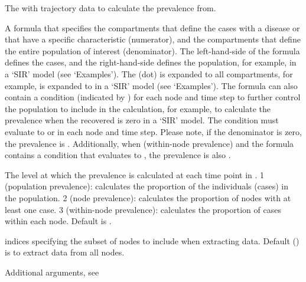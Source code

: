 \documentclass[letterpaper]{book}
\begin{document}
\begin{Arguments}
\begin{ldescription}
\item[\code{model}] The  with trajectory data to calculate
the prevalence from.

\item[\code{formula}] A formula that specifies the compartments that
define the cases with a disease or that have a specific
characteristic (numerator), and the compartments that define
the entire population of interest (denominator). The
left-hand-side of the formula defines the cases, and the
right-hand-side defines the population, for example,
 in a `SIR' model (see
`Examples'). The   (dot) is expanded to all
compartments, for example,   is expanded to
 in a `SIR' model (see
`Examples'). The formula can also contain a condition
(indicated by \code{|}) for each node and time step to further
control the population to include in the calculation, for
example,  to calculate the prevalence
when the recovered is zero in a `SIR' model. The
condition must evaluate to  or  in each
node and time step. Please note, if the denominator is zero,
the prevalence is . Additionally, when
 (within-node prevalence) and the formula
contains a condition that evaluates to , the
prevalence is also .

\item[\code{level}] The level at which the prevalence is calculated at
each time point in . 1 (population prevalence):
calculates the proportion of the individuals (cases) in the
population. 2 (node prevalence): calculates the proportion of
nodes with at least one case. 3 (within-node prevalence):
calculates the proportion of cases within each node. Default
is .

\item[\code{index}] indices specifying the subset of nodes to include
when extracting data. Default () is to
extract data from all nodes.

\item[\code{...}] Additional arguments, see
\end{ldescription}
\end{Arguments}
\end{document}
